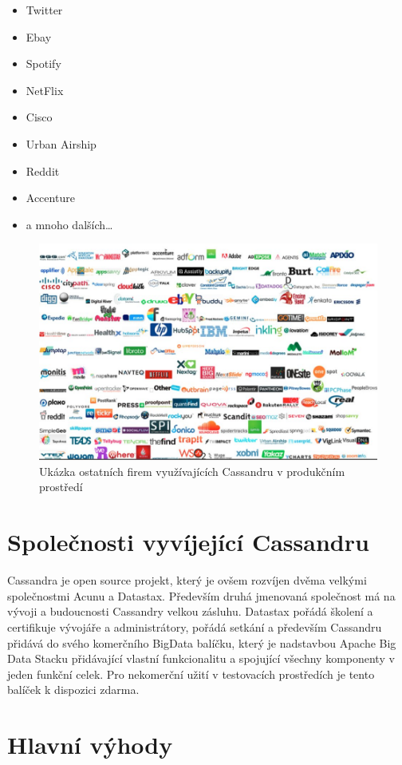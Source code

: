 \begin{itemize}
\item Twitter
\item Ebay
\item Spotify
\item NetFlix
\item Cisco
\item Urban Airship
\item Reddit
\item Accenture
\item a mnoho dalších…
\end{itemize} 

\begin{figure}[h]
\centering
\includegraphics[scale=0.45]{images/casa-production}
\caption{Ukázka ostatních firem využívajících Cassandru v produkčním prostředí}
\label{fig:yarn}
\end{figure}


\section{Společnosti vyvíjející Cassandru}
Cassandra je open source projekt, který je ovšem rozvíjen dvěma velkými společnostmi Acunu a Datastax. Především druhá jmenovaná společnost má na vývoji a budoucnosti Cassandry velkou zásluhu. Datastax pořádá školení a certifikuje vývojáře a administrátory, pořádá setkání a především Cassandru přidává do svého komerčního BigData balíčku, který je nadstavbou Apache Big Data Stacku přidávající vlastní funkcionalitu a spojující všechny komponenty v jeden funkční celek. Pro nekomerční užití v testovacích prostředích je tento balíček k dispozici zdarma.
\section{Hlavní výhody}

